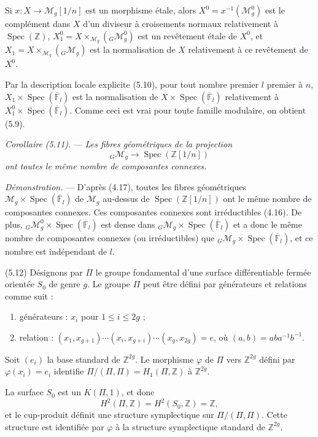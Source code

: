 \documentclass[10pt]{article}
\newcommand{\Spec}{\operatorname{Spec}}
\begin{document}
Si $x:X\to\mathcal M_g[1/n]$ est un morphisme étale, alors $X^0=x^{-1}(\mathcal M_g^0)$ est le complément dans $X$ d'un diviseur à croisements normaux relativement à $\Spec(\mathbb Z)$, $X_1^0=X\times_{\mathcal M_g}({}_G\mathcal M_g^0)$ est un revêtement étale de $X^0$, et $X_1=X\times_{\mathcal M_g}({}_G\mathcal M_g)$ est la normalisation de $X$ relativement à ce revêtement de $X^0$.

Par la description locale explicite (5.10), pour tout nombre premier $l$ premier à $n$, $X_1\times\Spec(\overline{\mathbb F}_l)$ est la normalisation de $X\times\Spec(\overline{\mathbb F}_l)$ relativement à $X_1^0\times\Spec(\overline{\mathbb F}_l)$. Comme ceci est vrai pour toute famille modulaire, on obtient (5.9).

\medskip
\noindent\emph{Corollaire (5.11).} --- \emph{Les fibres géométriques de la projection}
\[
{}_G\mathcal M_g\longrightarrow \Spec(\mathbb Z[1/n])
\]
\emph{ont toutes le même nombre de composantes connexes.}

\noindent\emph{Démonstration.} --- D'après (4.17), toutes les fibres géométriques $\mathcal M_g\times\Spec(\overline{\mathbb F}_l)$ de $\mathcal M_g$ au-dessus de $\Spec(\mathbb Z[1/n])$ ont le même nombre de composantes connexes. Ces composantes connexes sont irréductibles (4.16). De plus, ${}_G\mathcal M_g^0\times\Spec(\overline{\mathbb F}_l)$ est dense dans ${}_G\mathcal M_g\times\Spec(\overline{\mathbb F}_l)$ et a donc le même nombre de composantes connexes (ou irréductibles) que ${}_G\mathcal M_g\times\Spec(\overline{\mathbb F}_l)$, et ce nombre est indépendant de $l$.

\medskip
\noindent(5.12) Désignons par $\Pi$ le groupe fondamental d'une surface différentiable fermée orientée $S_0$ de genre $g$. Le groupe $\Pi$ peut être défini par générateurs et relations comme suit :
\begin{enumerate}[label=(\roman*)]
\item générateurs : $x_i$ pour $1\leq i\leq 2g$ ;
\item relation : $(x_1,x_{g+1})\cdots(x_i,x_{g+i})\cdots(x_g,x_{2g})=e$, où $(a,b)=aba^{-1}b^{-1}$.
\end{enumerate}
Soit $(e_i)$ la base standard de $\mathbb Z^{2g}$. Le morphisme $\varphi$ de $\Pi$ vers $\mathbb Z^{2g}$ défini par $\varphi(x_i)=e_i$ identifie $\Pi/(\Pi,\Pi)=H_1(\Pi,\mathbb Z)$ à $\mathbb Z^{2g}$.

La surface $S_0$ est un $K(\Pi,1)$, et donc
\[
H^2(\Pi,\mathbb Z)=H^2(S_0,\mathbb Z)=\mathbb Z,
\]
et le cup-produit définit une structure symplectique sur $\Pi/(\Pi,\Pi)$. Cette structure est identifiée par $\varphi$ à la structure symplectique standard de $\mathbb Z^{2g}$.
\end{document}
